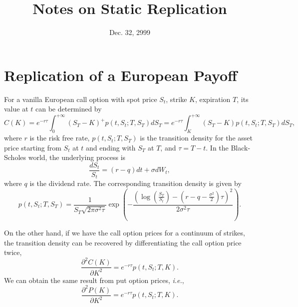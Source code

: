 \documentclass[12pt]{article}
\begin{document}
\title{Notes on Static Replication}
\date{Dec. 32, 2999}

\maketitle

\section{Replication of a European Payoff}

  For a vanilla European call option with spot price $S_t$, strike $K$, expiration $T$, its value at $t$ can be determined by
  \begin{equation}
    C(K) = e^{-r\tau}\int_{0}^{+\infty}(S_T-K)^+p(t,S_t;T,S_T)dS_T = e^{-r\tau}\int_{K}^{+\infty}(S_T-K)p(t,S_t;T,S_T)dS_T,
  \end{equation}
  where $r$ is the risk free rate, $p(t,S_t;T,S_T)$ is the transition density for the asset price starting from $S_t$ at $t$ and
  ending with $S_T$ at $T$, and $\tau=T-t$. In the Black-Scholes world, the underlying process is
  \begin{equation}
    \frac{dS_t}{S_t}=(r-q)dt+\sigma dW_t,
    \label{BS}
  \end{equation}
  where $q$ is the dividend rate. The corresponding transition density is given by
  \begin{equation}
    p(t,S_t;T,S_T)=\frac{1}{S_T\sqrt{2\pi\sigma^2\tau}}
    \exp\left(-\frac{\displaystyle \left(\log\left(\frac{S_T}{S_t}\right)-\left(r-q-\frac{\sigma^2}{2}\right)\tau\right)^2}{2\sigma^2\tau}\right).
    \label{density}
  \end{equation}

  On the other hand, if we have the call option prices for a continuum of strikes, the transition density can be recovered by
  differentiating the call option price twice,
  \begin{equation}
    \frac{\partial^2C(K)}{\partial K^2}=e^{-r\tau}p(t,S_t;T,K).
    \label{call}
  \end{equation}
  We can obtain the same result from put option prices, {\it i.e.},
  \begin{equation}
    \frac{\partial^2P(K)}{\partial K^2}=e^{-r\tau}p(t,S_t;T,K).
    \label{put}
  \end{equation}
\end{document}
